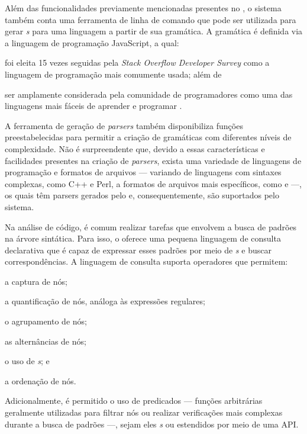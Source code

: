 \documentclass
  [11pt,a4paper,english,brazil,openright,sumario=tradicional,twoside]
  {abntex2}
\begin{document}
  Além das funcionalidades previamente mencionadas presentes no \treesitter, o
  sistema também conta uma ferramenta de linha de comando que pode ser
  utilizada para gerar \textit{s} para uma linguagem a partir de
  sua gramática. A gramática é definida via a linguagem de programação
  JavaScript, a qual:
  \begin{inparaenum}
    \item foi eleita 15 vezes seguidas pela
          \textit{Stack Overflow Developer Survey}
          \cite{stack-overflow-2022-stack} como a linguagem de programação mais
          comumente usada; além de
    \item ser amplamente considerada pela comunidade de programadores como uma
          das linguagens mais fáceis de aprender e programar
          \cites{berkeley-2023-11}{goel-2023-how}{w3schools-2023-javascript}.
  \end{inparaenum}
  A ferramenta de geração de \textit{parsers} também disponibiliza funções
  preestabelecidas para permitir a criação de gramáticas com diferentes níveis
  de complexidade. Não é surpreendente que, devido a essas características e
  facilidades presentes na criação de \textit{parsers}, exista uma variedade de
  linguagens de programação e formatos de arquivos --- variando de linguagens
  com sintaxes complexas, como C++ e Perl, a formatos de arquivos mais
  específicos, como  e  ---,
  os quais têm parsers gerados pelo \treesitter e, consequentemente, são
  suportados pelo sistema.

  Na análise de código, é comum realizar tarefas que envolvem a busca de
  padrões na árvore sintática. Para isso, o \treesitter oferece uma pequena
  linguagem de consulta declarativa que é capaz de expressar esses padrões por
  meio de \textit{s} e buscar correspondências. A linguagem
  de consulta suporta operadores que permitem:
  \begin{inparaenum}
    \item a captura de nós;
    \item a quantificação de nós, análoga às expressões regulares;
    \item o agrupamento de nós;
    \item as alternâncias de nós;
    \item o uso de \textit{s}; e
    \item a ordenação de nós.
  \end{inparaenum}
  Adicionalmente, é permitido o uso de predicados --- funções arbitrárias
  geralmente utilizadas para filtrar nós ou realizar verificações mais
  complexas durante a busca de padrões ---, sejam eles
  \textit{s} ou estendidos por meio de uma API.
\end{document}
